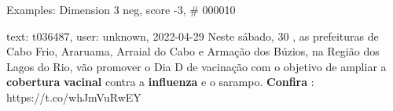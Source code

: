 \begin{frame}{Examples: Dimension 3 neg, score -3, \# 000010}
\footnotesize
\begin{alertblock}{text: t036487, user: unknown, 2022-04-29}
Neste sábado, 30 , as prefeituras de Cabo Frio, Araruama, Arraial do Cabo e 
Armação dos Búzios, na Região dos Lagos do Rio, vão promover o Dia D de 
vacinação com o objetivo de ampliar a \textbf{cobertura} \textbf{vacinal} 
contra a \textbf{influenza} e o sarampo. \textbf{Confira} : 
https://t.co/whJmVuRwEY 
\end{alertblock}
\end{frame}
